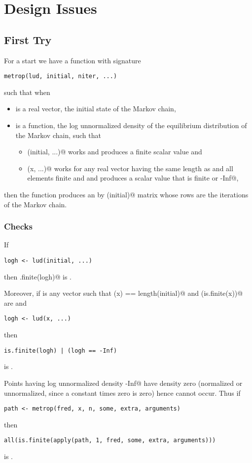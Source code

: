 \documentclass{article}
\begin{document}
\section{Design Issues}

\subsection{First Try}

For a start we have a function with signature
\begin{verbatim}
metrop(lud, initial, niter, ...)
\end{verbatim}
such that when
\begin{itemize}
\item \verb@initial@ is a real vector, the initial state of the Markov
chain,
\item \verb@lud@ is a function, the log unnormalized density of the
equilibrium distribution of the Markov chain,
such that
\begin{itemize}
\item \verb@lud(initial, ...)@ works and produces a finite scalar value and
\item \verb@lud(x, ...)@ works for any real vector \verb@x@
having the same length as \verb@initial@ and all elements finite and
and produces a scalar value that is finite or \verb@-Inf@,
\end{itemize}
\end{itemize}
then the function produces an \verb@niter@ by \verb@length(initial)@ matrix
whose rows are the iterations of the Markov chain.

\subsubsection{Checks}

If
\begin{verbatim}
logh <- lud(initial, ...)
\end{verbatim}
then \verb@is.finite(logh)@ is \verb@TRUE@.

Moreover, if \verb@x@ is any vector such that
\verb@length(x) == length(initial)@ and \verb@all(is.finite(x))@
are \verb@TRUE@ and
\begin{verbatim}
logh <- lud(x, ...)
\end{verbatim}
then
\begin{verbatim}
is.finite(logh) | (logh == -Inf)
\end{verbatim}
is \verb@TRUE@.

Points \verb@x@ having log unnormalized density \verb@-Inf@ have
density zero (normalized or unnormalized, since a constant times zero is zero)
hence cannot occur.  Thus if
\begin{verbatim}
path <- metrop(fred, x, n, some, extra, arguments)
\end{verbatim}
then
\begin{verbatim}
all(is.finite(apply(path, 1, fred, some, extra, arguments)))
\end{verbatim}
is \verb@TRUE@.
\end{document}
